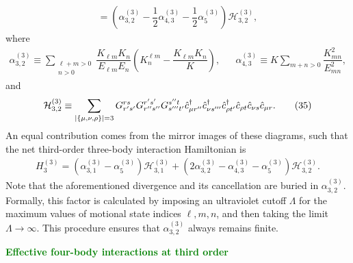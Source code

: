 \documentclass[preprint,showkeys,nofootinbib]{revtex4-1}
\newcommand{\f}{\dfrac} %
\newcommand{\p}[1]{\left(#1\right)} %
\renewcommand{\set}[1]{\left\{#1\right\}} %
\renewcommand{\c}{\hat{c}}
\newcommand{\n}{\hat{n}}
\renewcommand{\H}{\mathcal{H}}
\newcommand{\1}{\mathds{1}}
\newcommand{\green}[1]{\textcolor{green}{#1}}
\begin{document}
\begin{enumerate}
{\begin{multline}
      = \p{\alpha_{3,2}^{(3)}
        - \f12\alpha_{4,3}^{(3)} - \f12\alpha_5^{(3)}}
      \H_{3,2}^{(3)},
      \tag{33}
    \end{multline}
    where
    \begin{align}
      \alpha_{3,2}^{(3)}
      \equiv \sum_{\substack{\ell+m>0\\n>0}}
      \f{K_{\ell m} K_n}{E_{\ell m} E_n}
      \p{K^{\ell m}_n - \f{K_{\ell m} K_n}{K}},
      &&
      \alpha_{4,3}^{(3)}
      \equiv K \sum_{m+n>0} \f{K_{mn}^2}{E_{mn}^2},
      \tag{34}
    \end{align}
    and
    \begin{align}
      \H_{3,2}^{(3)} \equiv \sum_{\abs{\set{\mu,\nu,\rho}}=3}
      G^{rs}_{r's'} G^{r's'}_{r''s''} G^{s''t}_{s'''t'}
      \c_{\mu r''}^\dag \c_{\nu s'''}^\dag \c_{\rho t'}^\dag
      \c_{\rho t} \c_{\nu s} \c_{\mu r}.
      \tag{35}
    \end{align}
    An equal contribution comes from the mirror images of these
    diagrams, such that the net third-order three-body interaction
    Hamiltonian is
    \begin{align}
      H_3^{(3)} = \p{\alpha_{3,1}^{(3)} - \alpha_5^{(3)}} \H_{3,1}^{(3)}
      + \p{2\alpha_{3,2}^{(3)} - \alpha_{4,3}^{(3)} - \alpha_5^{(3)}}
      \H_{3,2}^{(3)}.
      \tag{36}
    \end{align}
    Note that the aforementioned divergence and its cancellation are
    buried in $\alpha_{3,2}^{(3)}$.  Formally, this factor is
    calculated by imposing an ultraviolet cutoff $\Lambda$ for the
    maximum values of motional state indices $\ell,m,n$, and then
    taking the limit $\Lambda\to\infty$.  This procedure ensures that
    $\alpha_{3,2}^{(3)}$ always remains finite.}

  \green{{\bf Effective four-body interactions at third order}}


\end{enumerate}
\end{document}
